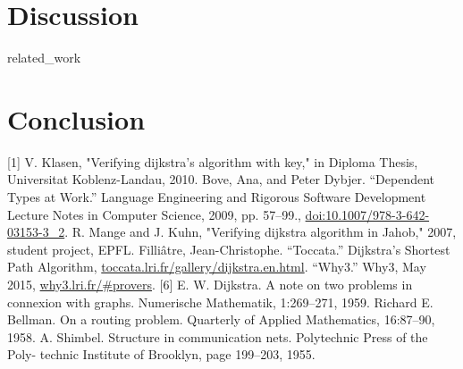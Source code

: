\documentclass[11pt, a4paper]{article} %
\theoremstyle{definition}
\begin{document}
\section{Discussion}



{related_work}



\section{Conclusion}

\newpage %

%

[1] V. Klasen, "Verifying dijkstra's algorithm with key," in Diploma Thesis, Universitat Koblenz-Landau, 2010.%
\newline
[2] Bove, Ana, and Peter Dybjer. “Dependent Types at Work.” Language Engineering and Rigorous Software Development Lecture Notes in Computer Science, 2009, pp. 57–99., \url{doi:10.1007/978-3-642-03153-3_2}. %
\newline
[3] R. Mange and J. Kuhn, "Verifying dijkstra algorithm in Jahob," 2007, student project, EPFL.%
\newline
[4] Filliâtre, Jean-Christophe. “Toccata.” Dijkstra's Shortest Path Algorithm, \url{toccata.lri.fr/gallery/dijkstra.en.html}.%
\newline
[5] “Why3.” Why3, May 2015, \url{why3.lri.fr/#provers}. %
\newline
[6] E. W. Dijkstra. A note on two problems in connexion with graphs. Numerische Mathematik, 1:269–271, 1959.
\newline 
[7] Richard E. Bellman. On a routing problem. Quarterly of Applied Mathematics, 16:87–90, 1958.
\newline
[8] A. Shimbel. Structure in communication nets. Polytechnic Press of the Poly- technic Institute of Brooklyn, page 199–203, 1955.
\end{document}
